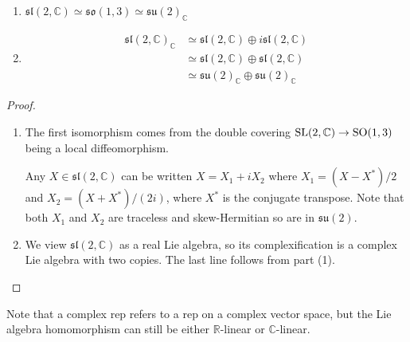 \begin{prop}
	\begin{enumerate}[(1)]
	    \item 
	$\mathfrak{sl}(2,\mathbb{C}) \simeq \mathfrak{so}(1,3)
	\simeq\mathfrak{su}(2)_{\mathbb{C}}$
		\item \phantom{}\vspace{-1.0cm}
	\begin{align*}
		\mathfrak{sl}(2,\mathbb{C})_{\mathbb{C}}
		&\simeq \mathfrak{sl}(2,\mathbb{C})\oplus i\mathfrak{sl}(2,\mathbb{C})\\
		&\simeq \mathfrak{sl}(2,\mathbb{C})\oplus \mathfrak{sl}(2,\mathbb{C}) \\
		&\simeq \mathfrak{su}(2)_{\mathbb{C}} \oplus \mathfrak{su}(2)_{\mathbb{C}}
	\end{align*}
	\end{enumerate}
\end{prop}
\begin{proof}
	\begin{enumerate}[(1)]
	    \item 
	The first isomorphism comes from the double covering $\operatorname{SL}(2,\mathbb{C}) \to
	\operatorname{SO}(1,3)$ being a local diffeomorphism.

	Any $X\in \mathfrak{sl}(2,\mathbb{C})$ can be written $X = X_1 + iX_2$ where
	$X_1= (X-X^*) /2$ and $X_2= (X+X^*) /(2i)$, where $X^*$ is the conjugate
	transpose. Note that both $X_1$ and $X_2$ are traceless and skew-Hermitian
	so are in $\mathfrak{su}(2)$.
		\item 
	We view $\mathfrak{sl}(2,\mathbb{C})$ as a real Lie algebra, so its
	complexification is a complex Lie algebra with two copies. 
	The last line follows from part (1).
	\end{enumerate}
\end{proof}
 
Note that a complex rep refers to a rep on a complex
vector space, but the Lie algebra homomorphism can still be either
$\mathbb{R}$-linear or $\mathbb{C}$-linear. 

